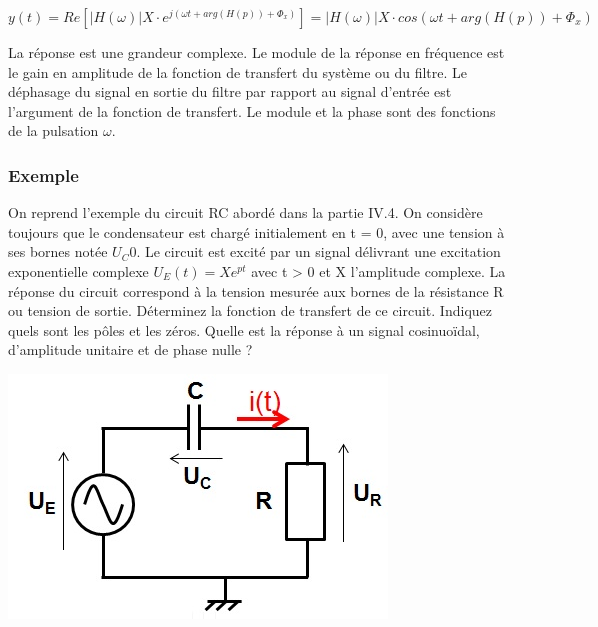 \documentclass[]{book}
\begin{document}
{	\begin{equation}\label{calcul_reponse_fonction_transfert}
	y(t) = Re[|H(\omega)|X\cdot e^{j(\omega t+arg(H(p))+\Phi_{x})}] =|H(\omega)|X\cdot cos(\omega t+arg(H(p))+\Phi_{x})
	\end{equation}
	
	La réponse est une grandeur complexe. Le module de la réponse en fréquence est le gain en amplitude de la fonction de transfert du système ou du filtre. Le déphasage du signal en sortie du filtre par rapport au signal d'entrée est l'argument de la fonction de transfert. Le module et la phase sont des fonctions de la pulsation $\omega$.
	
	
	\subsubsection{Exemple}
	
	\begin{minipage}[l]{0.7\linewidth}
		On reprend l'exemple du circuit RC abordé dans la partie IV.4. On considère toujours que le condensateur est chargé initialement en t = 0, avec une tension à ses bornes notée $U_C0$. Le circuit est excité par un signal délivrant une excitation exponentielle complexe $U_{E}(t)=Xe^{pt}$ avec t > 0 et X l'amplitude complexe. La réponse du circuit correspond à la tension mesurée aux bornes de la résistance R ou tension de sortie. Déterminez la fonction de transfert de ce circuit. Indiquez quels sont les pôles et les zéros. Quelle est la réponse à un signal cosinuoïdal, d'amplitude unitaire et de phase nulle ?	
	\end{minipage} \hfill
	\begin{minipage}[r]{0.4\linewidth}
		\includegraphics[scale=0.5]{images/circuit_RC_reponse_forcee.jpg} 	
	\end{minipage}
	\vspace{0.5\baselineskip}

}
\end{document}

